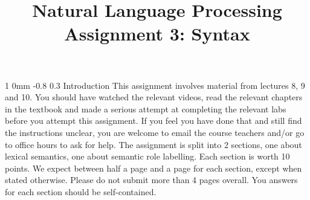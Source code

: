 \documentclass[11pt]{article}
\title{{\LARGE Natural Language Processing}\\[1.5mm]{\large Assignment 3: Syntax}}
\author{}
\date{} %
\makeatletter
\renewcommand{\section}{\@startsection
{section}%
{1}%
{0mm}%
{-0.8\baselineskip}%
{0.3\baselineskip}%
{\bfseries\large}}%
\makeatother
\begin{document}
 

\maketitle
\noindent
\section{Introduction}
\noindent This assignment involves material from lectures 8, 9 and
10. You should have watched the relevant videos, read the relevant
chapters in the textbook and made a serious attempt at completing the
relevant labs before you attempt this assignment. If you feel you have
done that and still find the instructions unclear, you are welcome to
email the course teachers and/or go to office hours to ask for help.
The assignment is split into 2 sections, one about lexical semantics,
one about semantic role labelling. Each section is worth 10 points. We
expect between half a page and a page for each section, except when
stated otherwise. Please do not submit more than 4 pages overall.  You
answers for each section should be self-contained.  
\end{document}
